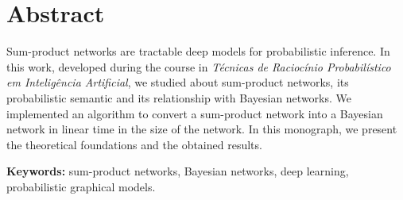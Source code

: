 \chapter*{Abstract}

\noindent Sum-product networks are tractable deep models for probabilistic inference. In this work, developed during the course in \emph{Técnicas de Raciocínio Probabilístico em Inteligência Artificial}, we studied about sum-product networks, its probabilistic semantic and its relationship with Bayesian networks. We implemented an algorithm to convert a sum-product network into a Bayesian network in linear time in the size of the network. In this monograph, we present the theoretical foundations and the obtained results.

\vspace{1em}

\noindent \textbf{Keywords:} sum-product networks, Bayesian networks, deep learning, probabilistic graphical models.
